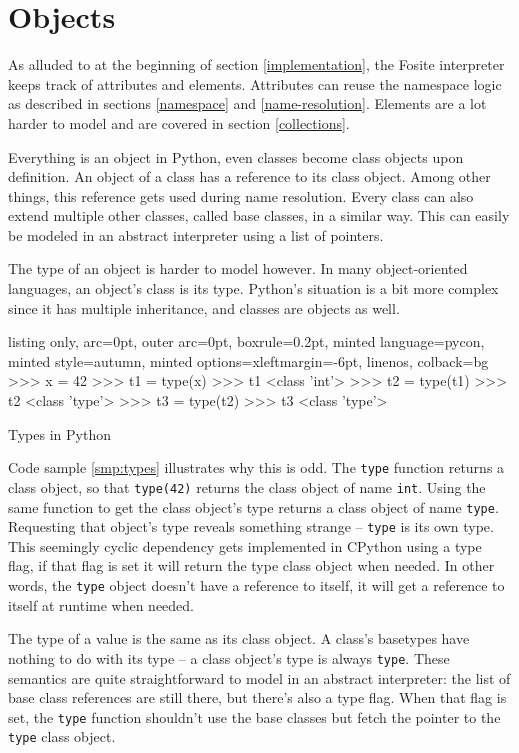 \documentclass[a4paper, 16pt, oneside]{Thesis}
\begin{document}
\section{Objects}\label{objects}

As alluded to at the beginning of section \ref{implementation}, the
Fosite interpreter keeps track of attributes and elements. Attributes
can reuse the namespace logic as described in sections \ref{namespace}
and \ref{name-resolution}. Elements are a lot harder to model and are
covered in section \ref{collections}.

Everything is an object in Python, even classes become class objects
upon definition. An object of a class has a reference to its class
object. Among other things, this reference gets used during name
resolution. Every class can also extend multiple other classes, called
base classes, in a similar way. This can easily be modeled in an
abstract interpreter using a list of pointers.

The type of an object is harder to model however. In many
object-oriented languages, an object's class is its type. Python's
situation is a bit more complex since it has multiple inheritance, and
classes are objects as well.

\begin{code}
  \begin{tcblisting}{listing only, 
  arc=0pt,
  outer arc=0pt, 
  boxrule=0.2pt,
  minted language=pycon,
  minted style=autumn,
  minted options={xleftmargin=-6pt, linenos},
  colback=bg }
>>> x = 42
>>> t1 = type(x)
>>> t1
<class 'int'>
>>> t2 = type(t1)
>>> t2
<class 'type'>
>>> t3 = type(t2)
>>> t3
<class 'type'>
\end{tcblisting}
\caption{Types in Python} \label{smp:types}
\end{code}

Code sample \ref{smp:types} illustrates why this is odd. The
\texttt{type} function returns a class object, so that \texttt{type(42)}
returns the class object of name \texttt{int}. Using the same function
to get the class object's type returns a class object of name
\texttt{type}. Requesting that object's type reveals something strange
-- \texttt{type} is its own type. This seemingly cyclic dependency gets
implemented in CPython using a type flag, if that flag is set it will
return the type class object when needed. In other words, the
\texttt{type} object doesn't have a reference to itself, it will get a
reference to itself at runtime when needed.

The type of a value is the same as its class object. A class's basetypes
have nothing to do with its type -- a class object's type is always
\texttt{type}. These semantics are quite straightforward to model in an
abstract interpreter: the list of base class references are still there,
but there's also a type flag. When that flag is set, the \texttt{type}
function shouldn't use the base classes but fetch the pointer to the
\texttt{type} class object.
\end{document}
